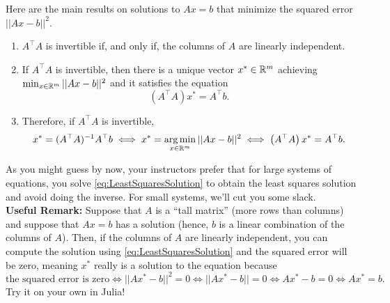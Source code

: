 \begin{tcolorbox}[sharp corners, colback=green!30, colframe=green!80!blue, title=\textbf{\large Least Squared Error Solutions to Linear Equations}]
Here are the main results on solutions to $Ax=b$ that minimize the squared error $||Ax-b||^2$.
\begin{enumerate}
\renewcommand{\labelenumi}{(\alph{enumi})}
\setlength{\itemsep}{.2cm}

\item $A^\top A$ is invertible if, and only if, the columns of $A$ are linearly independent.

\item If $A^\top A$ is invertible, then there is a unique vector $x^\ast \in \mathbb R^m$ achieving $\min_{x \in \mathbb R^m } ||Ax-b ||^2$ and it satisfies the equation
\begin{equation}
    \label{eq:LeastSquaresSolution}
    \left(A^\top A \right) x^\ast = A^\top b.
\end{equation}
\item Therefore, if $A^\top A$ is invertible, 
\begin{equation}
    \label{eq:ThmLeastSqaredErrorSolution}
  x^\ast = (A^\top A)^{-1} A^\top b  \iff  x^\ast = \operatorname*{arg\,min}_{x \in \mathbb R^m} ||Ax-b ||^2 \iff \left(A^\top A \right) x^\ast = A^\top b.
\end{equation}
\end{enumerate}
As you might guess by now, your instructors prefer that for large systems of equations, you solve \eqref{eq:LeastSquaresSolution} to obtain the least squares solution and avoid doing the inverse. For small systems, we'll cut you some slack.\\

\textbf{Useful Remark:} Suppose that $A$ is a ``tall matrix'' (more rows than columns) and suppose that $Ax=b$ has a solution (hence, $b$ is a linear combination of the columns of $A$). Then, if the columns of $A$ are linearly independent, you can compute the solution using \eqref{eq:LeastSquaresSolution} and the squared error will be zero, meaning $x^\ast$ really is a solution to the equation because $$\text{the squared error is zero} \iff ||A x^\ast - b||^2 = 0 \iff ||A x^\ast - b|| = 0 \iff A x^\ast - b=0 \iff A x^\ast = b.$$ 
Try it on your own in Julia!
\end{tcolorbox}

\vspace*{0.2cm}

